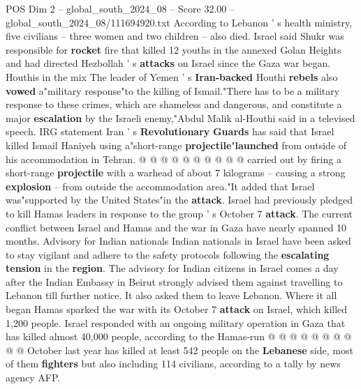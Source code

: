 \begin{textsample}{POS Dim 2 – global\_south\_2024\_08 – Score 32.00 – global\_south\_2024\_08/111694920.txt}
According to Lebanon ' s health ministry, five civilians -- three women and two children -- also died.
Israel said Shukr was responsible for \textbf{rocket} fire that killed 12 youths in the annexed Golan Heights and had directed Hezbollah ' s \textbf{attacks} on Israel since the Gaza war began.
Houthis in the mix The leader of Yemen ' s \textbf{Iran-backed} Houthi \textbf{rebels} also \textbf{vowed} a"military response"to the killing of Ismail."There has to be a military response to these crimes, which are shameless and dangerous, and constitute a major \textbf{escalation} by the Israeli enemy,"Abdul Malik al-Houthi said in a televised speech.
IRG statement Iran ' s \textbf{Revolutionary} \textbf{Guards} has said that Israel killed Ismail Haniyeh using a"short-range \textbf{projectile}"\textbf{launched} from outside of his accommodation in Tehran. @ @ @ @ @ @ @ @ @ @ carried out by firing a short-range \textbf{projectile} with a warhead of about 7 kilograms -- causing a strong \textbf{explosion} -- from outside the accommodation area."It added that Israel was"supported by the United States"in the \textbf{attack}.
Israel had previously pledged to kill Hamas leaders in response to the group ' s October 7 \textbf{attack}.
The current conflict between Israel and Hamas and the war in Gaza have nearly spanned 10 months.
Advisory for Indian nationals Indian nationals in Israel have been asked to stay vigilant and adhere to the safety protocols following the \textbf{escalating} \textbf{tension} in the \textbf{region}.
The advisory for Indian citizens in Israel comes a day after the Indian Embassy in Beirut strongly advised them against travelling to Lebanon till further notice.
It also asked them to leave Lebanon.
Where it all began Hamas sparked the war with its October 7 \textbf{attack} on Israel, which killed 1,200 people.
Israel responded with an ongoing military operation in Gaza that has killed almost 40,000 people, according to the Hamas-run @ @ @ @ @ @ @ @ @ @ October last year has killed at least 542 people on the \textbf{Lebanese} side, most of them \textbf{fighters} but also including 114 civilians, according to a tally by news agency AFP.

\end{textsample}
